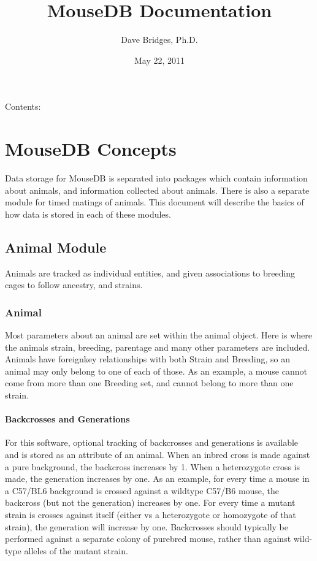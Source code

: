 \documentclass[letterpaper,10pt,english]{sphinxmanual}
\title{MouseDB Documentation}
\date{May 22, 2011}
\author{Dave Bridges, Ph.D.}
\begin{document}
\maketitle
\tableofcontents
{}\label{index::doc}


Contents:


\chapter{MouseDB Concepts}
\label{concepts:welcome-to-mousedb-s-documentation}\label{concepts::doc}\label{concepts:mousedb-concepts}
Data storage for MouseDB is separated into packages which contain information about animals, and information collected about animals.  There is also a separate module for timed matings of animals.  This document will describe the basics of how data is stored in each of these modules.


\section{Animal Module}
\label{concepts:animal-module}
Animals are tracked as individual entities, and given associations to breeding cages to follow ancestry, and strains.


\subsection{Animal}
\label{concepts:animal}
Most parameters about an animal are set within the animal object.  Here is where the animals strain, breeding, parentage and many other parameters are included.  Animals have foreignkey relationships with both Strain and Breeding, so an animal may only belong to one of each of those.  As an example, a mouse cannot come from more than one Breeding set, and cannot belong to more than one strain.


\subsubsection{Backcrosses and Generations}
\label{concepts:backcrosses-and-generations}
For this software, optional tracking of backcrosses and generations is available and is stored as an attribute of an animal.  When an inbred cross is made against a pure background, the backcross increases by 1.  When a heterozygote cross is made, the generation increases by one.  As an example, for every time a mouse in a C57/BL6 background is crossed against a wildtype C57/B6 mouse, the backcross (but not the generation) increases by one.  For every time a mutant strain is crosses against itself (either vs a heterozygote or homozygote of that strain), the generation will increase by one.  Backcrosses should typically be performed against a separate colony of purebred mouse, rather than against wild-type alleles of the mutant strain.
\end{document}
